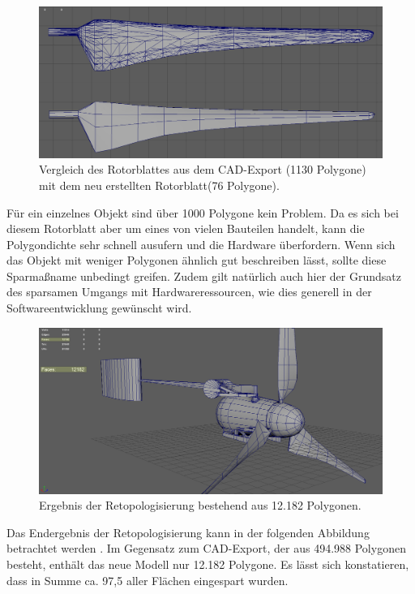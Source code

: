 \begin{figure}[H]
	\centering
	\captionsetup{width=1\textwidth}
	\includegraphics[keepaspectratio, width=1\textwidth]{bildquellen/rotorblattGeo}
	\caption{Vergleich des Rotorblattes aus dem CAD-Export (1130 Polygone) mit dem neu erstellten Rotorblatt(76 Polygone).}
	\label{fig:2.6}
\end{figure}

Für ein einzelnes Objekt sind über 1000 Polygone kein Problem. Da es sich bei diesem Rotorblatt aber um eines von vielen Bauteilen handelt, kann die Polygondichte sehr schnell ausufern und die Hardware überfordern. Wenn sich das Objekt mit weniger Polygonen ähnlich gut beschreiben lässt, sollte diese Sparmaßname unbedingt greifen. Zudem gilt natürlich auch hier der Grundsatz des sparsamen Umgangs mit Hardwareressourcen, wie dies generell in der Softwareentwicklung gewünscht wird.  

\begin{figure}[H]
	\centering
	\captionsetup{width=1\textwidth}
	\includegraphics[keepaspectratio, width=1\textwidth]{bildquellen/WEA-Vergleich2}
	\caption{Ergebnis der Retopologisierung bestehend aus 12.182 Polygonen.}
	\label{fig:2.7}
\end{figure}

Das Endergebnis der Retopologisierung kann in der folgenden Abbildung betrachtet werden  . Im Gegensatz zum CAD-Export, der aus 494.988 Polygonen besteht, enthält das neue Modell nur 12.182 Polygone. Es lässt sich konstatieren, dass in Summe ca. 97,5 aller Flächen eingespart wurden.
